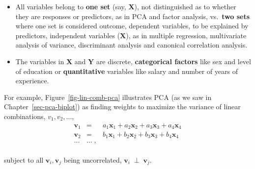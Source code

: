 \documentclass[
  letterpaper,
  10pt,
  krantz2]{krantz}
\begin{document}
{\begin{itemize}
\item
  All variables belong to \textbf{one set} (say, \(\mathbf{X}\)), not
  distinguished as to whether they are responses or predictors, as in
  PCA and factor analysis, vs.~\textbf{two sets} where one set is
  considered outcome, dependent variables, to be explained by
  predictors, independent variables (\(\mathbf{X}\)), as in multiple
  regression, multivariate analysis of variance, discriminant analysis
  and canonical correlation analysis.
\item
  The variables in \(\mathbf{X}\) and \(\mathbf{Y}\) are discrete,
  \textbf{categorical factors} like sex and level of education or
  \textbf{quantitative} variables like salary and number of years of
  experience.
\end{itemize}

For example, Figure~\ref{fig-lin-comb-pca} illustrates PCA (as we saw in
Chapter~\ref{sec-pca-biplot}) as finding weights to maximize the
variance of linear combinations, \(v_1, v_2, ...\), \begin{eqnarray*}
\mathbf{v}_1 & = & a_1 \mathbf{x}_1 + a_2 \mathbf{x}_2 + a_3 \mathbf{x}_3 + a_4 \mathbf{x}_4 \\
\mathbf{v}_2 & = & b_1 \mathbf{x}_1 + b_2 \mathbf{x}_2 + b_3 \mathbf{x}_3 + b_4 \mathbf{x}_4 \\
\dots & \dots \; , \\
\end{eqnarray*}

subject to all \(\mathbf{v}_i, \mathbf{v}_j\) being uncorrelated,
\(\mathbf{v}_i \;\perp\; \mathbf{v}_j\).

\begin{figure}

\end{figure}}
\end{document}
